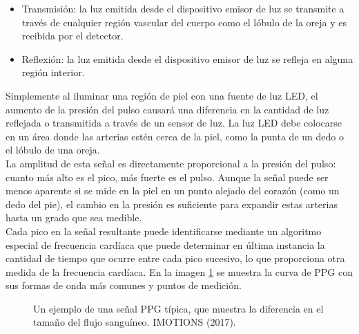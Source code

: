 			\begin{itemize}
				\item Transmisión: la luz emitida desde el dispositivo emisor de luz se transmite a través de cualquier región vascular del cuerpo como el lóbulo de la oreja y es recibida por el detector.
				\item Reflexión: la luz emitida desde el dispositivo emisor de luz se refleja en alguna región interior.
			\end{itemize}
			
			Simplemente al iluminar una región de piel con una fuente de luz LED, el aumento de la presión del pulso causará una diferencia en la cantidad de luz reflejada o transmitida a través de un sensor de luz. La luz LED debe colocarse en un área donde las arterias estén cerca de la piel, como la punta de un dedo o el lóbulo de una oreja. \\
			
			La amplitud de esta señal es directamente proporcional a la presión del pulso: cuanto más alto es el pico, más fuerte es el pulso. Aunque la señal puede ser menos aparente si se mide en la piel en un punto alejado del corazón (como un dedo del pie), el cambio en la presión es suficiente para expandir estas arterias hasta un grado que sea medible. \\
			
			Cada pico en la señal resultante puede identificarse mediante un algoritmo especial de frecuencia cardíaca que puede determinar en última instancia la cantidad de tiempo que ocurre entre cada pico sucesivo, lo que proporciona otra medida de la frecuencia cardíaca. En la imagen \ref{fig:PPGwave} se muestra la curva de PPG con sus formas de onda más comunes y puntos de medición. \\
		
		\begin{figure}[htbp!]
			\centering
			\caption{Un ejemplo de una señal PPG típica, que muestra la diferencia en el tamaño del flujo sanguíneo. IMOTIONS (2017).}
			\label{fig:PPGwave}
		\end{figure}
			
